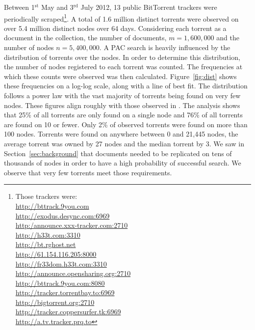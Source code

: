     Between 1$^{\textrm{st}}$ May and 3$^{\textrm{rd}}$ July 2012, 13 public BitTorrent trackers were periodically scraped\footnote{Those trackers were:\\
        \url{http://bttrack.9you.com}\\
        \url{http://exodus.desync.com:6969}\\
        \url{http:/announce.xxx-tracker.com:2710}\\
        \url{http://h33t.com:3310}\\
        \url{http://bt.rghost.net}\\
        \url{http://61.154.116.205:8000}\\
        \url{http://fr33dom.h33t.com:3310}\\
        \url{http://announce.opensharing.org:2710}\\
        \url{http://bttrack.9you.com:8080}\\
        \url{http://tracker.torrentbay.to:6969}\\
        \url{http://bigtorrent.org:2710}\\
        \url{http://tracker.coppersurfer.tk:6969}\\
        \url{http://a.tv.tracker.prq.to}
    }. A total of 1.6 million distinct torrents were observed on over 5.4 million distinct nodes over 64 days. Considering each torrent as a document in the collection, the number of documents, $m=1,600,000$ and the number of nodes $n=5,400,000$. A PAC search is heavily influenced by the distribution of torrents over the nodes. In order to determine this distribution, the number of nodes registered to each torrent was counted. The frequencies at which these counts were observed was then calculated. Figure~\ref{fig:dist} shows these frequencies on a log-log scale, along with a line of best fit. The distribution follows a power law with the vast majority of torrents being found on very few nodes. These figures align roughly with those observed in \cite{guo_measurements_2005,dan_power-law_2010}. The analysis shows that 25\% of all torrents are only found on a single node and 76\% of all torrents are found on 10 or fewer. Only 2\% of observed torrents were found on more than 100 nodes. Torrents were found on anywhere between 0 and 21,445 nodes, the average torrent was owned by 27 nodes and the median torrent by 3. We saw in Section~\ref{sec:background} that documents needed to be replicated on tens of thousands of nodes in order to have a high probability of successful search. We observe that very few torrents meet those requirements.

